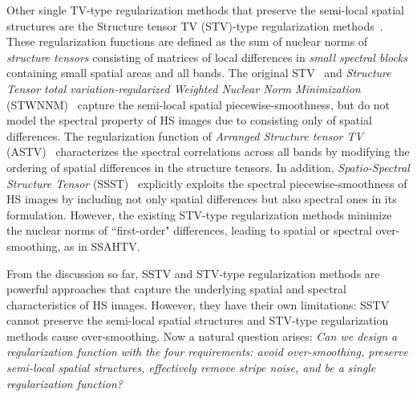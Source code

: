 \documentclass[10pt,journal]{IEEEtran}
\begin{document}
Other single TV-type regularization methods that preserve the semi-local spatial structures are the Structure tensor TV (STV)-type regularization methods~\cite{Lefkimmiatis2015STV, Wu2017STWNNM, Ono2016ASTV, Kurihara2017SSST}.
These regularization functions are defined as the sum of nuclear norms of \textit{structure tensors} consisting of matrices of local differences in \textit{small spectral blocks} containing small spatial areas and all bands.
The original STV~\cite{Lefkimmiatis2015STV} and \textit{Structure Tensor total variation-regularized Weighted Nuclear Norm Minimization} (STWNNM)~\cite{Wu2017STWNNM} capture the semi-local spatial piecewise-smoothness, but do not model the spectral property of HS images due to consisting only of spatial differences.
The regularization function of \textit{Arranged Structure tensor TV} (ASTV)~\cite{Ono2016ASTV} characterizes the spectral correlations across all bands by modifying the ordering of spatial differences in the structure tensors.
In addition, \textit{Spatio-Spectral Structure Tensor} (SSST)~\cite{Kurihara2017SSST} explicitly exploits the spectral piecewise-smoothness of HS images by including not only spatial differences but also spectral ones in its formulation.
However, the existing STV-type regularization methods minimize the nuclear norms of “first-order" differences, leading to spatial or spectral over-smoothing, as in SSAHTV.


From the discussion so far, SSTV and STV-type regularization methods are powerful approaches that capture the underlying spatial and spectral characteristics of HS images.
However, they have their own limitations: SSTV cannot preserve the semi-local spatial structures and STV-type regularization methods cause over-smoothing.
Now a natural question arises: \textit{Can we design a regularization function with the four requirements: avoid over-smoothing, preserve semi-local spatial structures, effectively remove stripe noise, and be a single regularization function?} 
\end{document}
